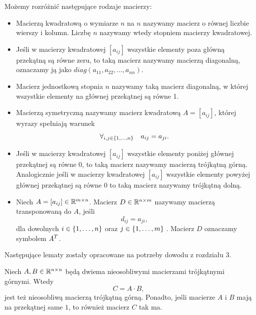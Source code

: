 \documentclass[12pt,a4paper]{report}
\newcommand{\mx}[1]{{#1}}
\begin{document}
\begin{definition} \label{definicja-macierzy}
Możemy rozróżnić następujące rodzaje macierzy:
\begin{itemize}
\item Macierzą kwadratową o wymiarze $n$ na $n$ nazywamy macierz o równej liczbie wierszy i kolumn. Liczbę $n$ nazywamy wtedy stopniem macierzy kwadratowej.
\item Jeśli w macierzy kwadratowej $[a_{ij}]$ wszystkie elementy poza główną przekątną są równe zeru, to taką macierz nazywamy macierzą diagonalną, oznaczamy ją jako $diag(a_{11}, a_{22},\ldots,a_{nn})$.
\item Macierz jednostkową stopnia $n$ nazywamy taką macierz diagonalną, w której wszystkie elementy na głównej przekątnej są równe 1.
\item Macierzą symetryczną nazywamy macierz kwadratową $\mx{A}=[a_{ij}]$, której wyrazy spełniają warunek 
$$
\forall_{i,j \in \left\lbrace {1,\ldots,n} \right\rbrace} \quad a_{ij}=a_{ji}.
$$ 
\item Jeśli w macierzy kwadratowej $[a_{ij}]$ wszystkie elementy poniżej głównej przekątnej są równe $0$, to taką macierz nazywamy macierzą trójkątną górną.
Analogicznie jeśli w macierzy kwadratowej $[a_{ij}]$ wszystkie elementy powyżej głównej przekątnej są równe $0$ to taką macierz nazywamy trójkątną dolną.
\item Niech $\mx{A}=[a_{ij}] \in \setR^{m \times n}$. Macierz $D \in \mathbb{R}^{n \times m}$ nazywamy macierzą transponowaną do $A$, jeśli
$$
d_{ij} = a_{ji},
$$
dla dowolnych $i \in \left\lbrace {1,\ldots, n} \right\rbrace$ oraz $j \in \left\lbrace {1,\ldots,m} \right\rbrace$ . Macierz $D$ oznaczamy symbolem ${A}^T$.
\end{itemize}

\end{definition}
Następujące lematy zostały opracowane na potrzeby dowodu z rozdziału 3.
\begin{lemma} \label{lemma-upper-triangle-multiplication}
Niech $\mx{A}, \mx{B} \in \setR^{n \times n}$ będą dwiema nieosobliwymi macierzami trójkątnymi górnymi. Wtedy
$$
\mx{C} = \mx{A} \cdot \mx{B},
$$
jest też nieosobliwą macierzą trójkątną górną. Ponadto, jeśli macierze $\mx{A}$ i $\mx{B}$ mają na przekątnej same $1$, to również macierz $\mx{C}$ tak ma.
\end{lemma}
\end{document}

